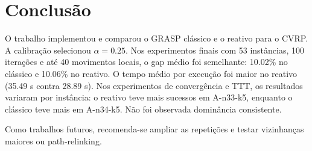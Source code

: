 \section{Conclusão}

O trabalho implementou e comparou o GRASP clássico e o reativo para o CVRP. A calibração selecionou $\alpha=0.25$. Nos experimentos finais com 53 instâncias, 100 iterações e até 40 movimentos locais, o gap médio foi semelhante: 10.02\% no clássico e 10.06\% no reativo. O tempo médio por execução foi maior no reativo (35.49 s contra 28.89 s). Nos experimentos de convergência e TTT, os resultados variaram por instância: o reativo teve mais sucessos em A-n33-k5, enquanto o clássico teve mais em A-n34-k5. Não foi observada dominância consistente.

Como trabalhos futuros, recomenda-se ampliar as repetições e testar vizinhanças maiores ou path-relinking.
